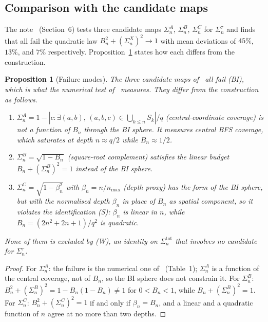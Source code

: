 \documentclass[11pt,a4paper]{article}
\newtheorem{proposition}[theorem]{Proposition}
\begin{document}
    \subsection{Comparison with the candidate maps}\label{sec:candidates}

      The note~\cite{Beau2026n} (Section~6) tests three candidate maps
      $\Sigma_n^A$, $\Sigma_n^B$, $\Sigma_n^C$ for $\Sigma_n^\tau$ and finds that all fail the quadratic
      law $B_n^2 + (\Sigma_n^X)^2 \to 1$ with mean deviations of $45\%$, $13\%$, and $7\%$
      respectively.
      Proposition~\ref{prop:failure} states how each differs from the construction.

      \begin{proposition}[Failure modes]\label{prop:failure}
        The three candidate maps of~\cite{Beau2026n} all fail \textup{(BI)}, which is what the numerical test
        of~\cite{Beau2026n} measures.
        They differ from the construction as follows.
        \begin{enumerate}
          \item $\Sigma_n^A = 1 - |{c : \exists(a,b),\,(a,b,c)\in\bigcup_{k\leq n} S_k}|/q$
          (central-coordinate coverage) is not a function of $B_n$ through the BI sphere.
          It measures central BFS coverage, which saturates at depth $n\approx q/2$ while $B_n \approx 1/2$.
          \item $\Sigma_n^B = \sqrt{1-B_n}$ (square-root complement) satisfies the linear budget
          $B_n + (\Sigma_n^B)^2 = 1$ instead of the BI sphere.
          \item $\Sigma_n^C = \sqrt{1-\beta_n^2}$ with $\beta_n = n/n_{\max}$ (depth proxy) has the form of the BI
          sphere, but with the normalised depth $\beta_n$ in place of $B_n$ as spatial component, so it violates the
          identification \textup{(S)}: $\beta_n$ is linear in $n$, while $B_n = (2n^2+2n+1)/q^2$ is quadratic.
        \end{enumerate}
        None of them is excluded by \textup{(W)}, an identity on $\Sigma_n^{\mathrm{tot}}$ that involves no candidate
        for $\Sigma_n^\tau$.
      \end{proposition}

      \begin{proof}
        For $\Sigma_n^A$: the failure is the numerical one of~\cite{Beau2026n} (Table~1); $\Sigma_n^A$ is a function of
        the central coverage, not of $B_n$, so the BI sphere does not constrain it.
        For $\Sigma_n^B$: $B_n^2 + (\Sigma_n^B)^2 = 1 - B_n(1-B_n) \neq 1$ for $0 < B_n < 1$, while
        $B_n + (\Sigma_n^B)^2 = 1$.
        For $\Sigma_n^C$: $B_n^2 + (\Sigma_n^C)^2 = 1$ if and only if $\beta_n = B_n$, and a linear and a quadratic
        function of $n$ agree at no more than two depths.
      \end{proof}
\end{document}
